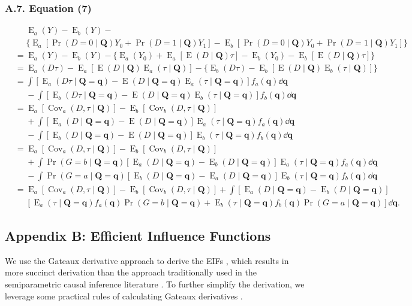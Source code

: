 \documentclass[12pt,a4paper]{article}
\newcommand{\Cov}{\operatorname{Cov}}
\newcommand{\E}{\operatorname{E}}
\def\Q{{\boldsymbol Q}}
\def\q{{\boldsymbol q}}
\DeclareMathOperator{\Pro}{Pr}
\begin{document}
\subsubsection*{A.7. Equation (7)}
\begin{align*}
&\phantom{{}={}} \E_a(Y)-\E_b(Y) - \\ 
&\phantom{{}={}} \lbrace \E_a[\Pro(D=0 \mid \Q) Y_0 + \Pro(D=1 \mid \Q) Y_1] - \E_b[\Pro(D=0 \mid \Q) Y_0 + \Pro(D=1 \mid \Q) Y_1] \rbrace \\
&= \E_a(Y)-\E_b(Y) - \lbrace \E_a(Y_0) + \E_a[\E(D \mid \Q) \tau] - \E_b(Y_0) - \E_b[\E(D \mid \Q) \tau] \rbrace \\
&= \E_a(D\tau)-\E_a[\E(D \mid \Q) \E_a(\tau \mid \Q)] - \lbrace \E_b(D\tau)-\E_b[\E(D \mid \Q) \E_b(\tau \mid \Q)] \rbrace \\
&= \int [\E_a(D \tau \mid \Q=\q) - \E(D \mid \Q=\q) \E_a(\tau \mid \Q=\q)] f_a(\q) \dd \q\\
&\phantom{{}={}} -\int [\E_b(D \tau \mid \Q=\q) - \E(D \mid \Q=\q) \E_b(\tau \mid \Q=\q)] f_b(\q) \dd \q\\
&= \E_a[\Cov_a(D,\tau \mid \Q)] - \E_b[\Cov_b(D,\tau \mid \Q)] \\
&\phantom{{}={}} + \int [\E_a(D \mid \Q=\q) - \E(D \mid \Q=\q)] \E_a(\tau \mid \Q=\q) f_a(\q) \dd \q\\
&\phantom{{}={}} - \int [\E_b(D \mid \Q=\q) - \E(D \mid \Q=\q)] \E_b(\tau \mid \Q=\q) f_b(\q) \dd \q\\
&= \E_a[\Cov_a(D,\tau \mid \Q)] - \E_b[\Cov_b(D,\tau \mid \Q)] \\
&\phantom{{}={}} + \int \Pro(G=b \mid \Q=\q) [\E_a(D \mid \Q=\q) - \E_b(D \mid \Q=\q)] \E_a(\tau \mid \Q=\q) f_a(\q) \dd \q\\
&\phantom{{}={}} - \int \Pro(G=a \mid \Q=\q) [\E_b(D \mid \Q=\q) - \E_a(D \mid \Q=\q)] \E_b(\tau \mid \Q=\q) f_b(\q) \dd \q\\
&= \E_a[\Cov_a(D,\tau \mid \Q)] - \E_b[\Cov_b(D,\tau \mid \Q)] + \int [\E_a(D \mid \Q=\q) - \E_b(D \mid \Q=\q)] \\
&\phantom{{}={}} [\E_a(\tau \mid \Q=\q)f_a(\q)\Pro(G=b \mid \Q=\q) + \E_b(\tau \mid \Q=\q)f_b(\q)\Pro(G=a \mid \Q=\q)] \dd \q.
\end{align*}


\subsection*{Appendix B: Efficient Influence Functions}
We use the Gateaux derivative approach to derive the EIFs \citep{ichimura_influence_2022}, which results in more succinct derivation than the approach traditionally used in the semiparametric causal inference literature \citep[e.g.,][]{hahn_role_1998}. To further simplify the derivation, we leverage some practical rules of calculating Gateaux derivatives \citep{hines_demystifying_2022, kennedy_semiparametric_2022}.
\end{document}
